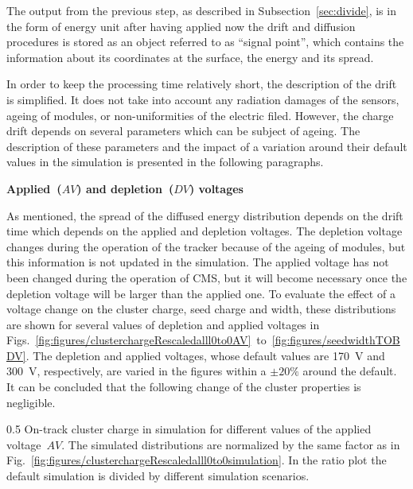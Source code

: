 The output from the previous step, as described in Subsection~\ref{sec:divide}, is in the form of energy unit after having applied now the drift and diffusion procedures is stored as an object referred to as ``signal point'', which contains the information about its coordinates at the surface, the energy and its spread.

In order to keep the processing time relatively short, the description of the drift is simplified. It does not take into account any radiation damages of the sensors, ageing of modules, or non-uniformities of the electric filed. However, the charge drift depends on several parameters which can be subject of ageing. The description of these parameters and the impact of a variation around their default values in the  simulation is presented in the following paragraphs. 

\textbf{Applied~($AV$) and depletion~($DV$) voltages}

As mentioned, the spread of the diffused energy distribution depends on the drift time which depends on the applied and depletion voltages. The depletion voltage changes during the operation of the tracker because of the ageing of modules, but this information is not updated in the simulation. The applied voltage has not been changed during the operation of CMS, but it will become necessary once the depletion voltage will be larger than the applied one. To evaluate the effect of a voltage change on the cluster charge, seed charge and width, these distributions are shown for several values of depletion and applied voltages in Figs.~\ref{fig:figures/clusterchargeRescaledalll0to0AV}~to~\ref{fig:figures/seedwidthTOBDV}. The depletion and applied voltages, whose default values are 170~V and  300~V, respectively, are varied in the figures within a $\pm 20\%$ around the default. It can be concluded that the following change of the cluster properties is negligible.


                 {0.5}       %
                 { On-track cluster charge in simulation for different values of the applied voltage~$AV$.  The simulated distributions are normalized by the same factor as in Fig.~\ref{fig:figures/clusterchargeRescaledalll0to0simulation}. In the ratio plot the default simulation is divided by different simulation scenarios. }

